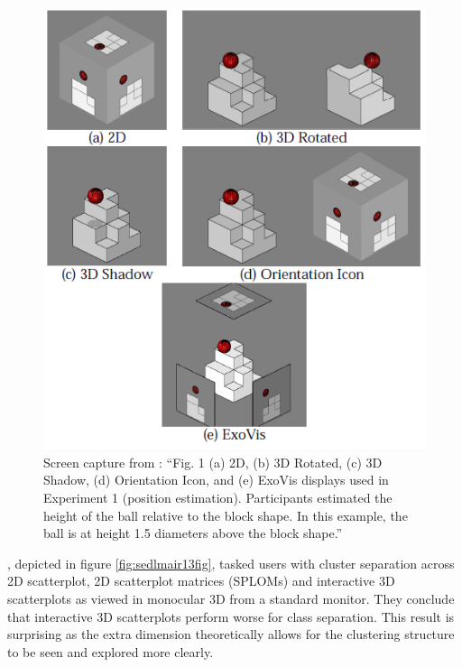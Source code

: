\documentclass{monashthesis}
\begin{document}
\begin{figure}

{\centering \includegraphics[width=0.5\linewidth]{./figures/tory06fig} 

}

\caption{Screen capture from
\textcite{tory_visualization_2006}: ``Fig. 1 (a) 2D, (b) 3D Rotated, (c)
3D Shadow, (d) Orientation Icon, and (e) ExoVis displays used in
Experiment 1 (position estimation). Participants estimated the height of
the ball relative to the block shape. In this example, the ball is at
height 1.5 diameters above the block shape.''}\label{fig:tory06fig}
\end{figure}

\textcite{sedlmair_empirical_2013}, depicted in figure
\ref{fig:sedlmair13fig}, tasked users with cluster separation across 2D
scatterplot, 2D scatterplot matrices (SPLOMs) and interactive 3D
scatterplots as viewed in monocular 3D from a standard monitor. They
conclude that interactive 3D scatterplots perform worse for class
separation. This result is surprising as the extra dimension
theoretically allows for the clustering structure to be seen and
explored more clearly.
\end{document}
